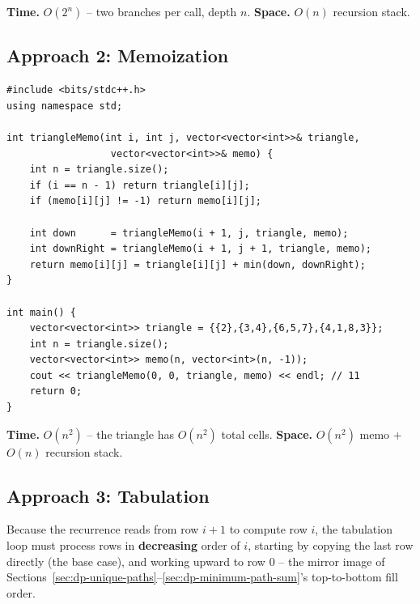\begin{complexitybox}
\textbf{Time.} $O(2^n)$ -- two branches per call, depth $n$.
\textbf{Space.} $O(n)$ recursion stack.
\end{complexitybox}

\subsection*{Approach 2: Memoization}

\begin{lstlisting}
#include <bits/stdc++.h>
using namespace std;

int triangleMemo(int i, int j, vector<vector<int>>& triangle,
                  vector<vector<int>>& memo) {
    int n = triangle.size();
    if (i == n - 1) return triangle[i][j];
    if (memo[i][j] != -1) return memo[i][j];

    int down      = triangleMemo(i + 1, j, triangle, memo);
    int downRight = triangleMemo(i + 1, j + 1, triangle, memo);
    return memo[i][j] = triangle[i][j] + min(down, downRight);
}

int main() {
    vector<vector<int>> triangle = {{2},{3,4},{6,5,7},{4,1,8,3}};
    int n = triangle.size();
    vector<vector<int>> memo(n, vector<int>(n, -1));
    cout << triangleMemo(0, 0, triangle, memo) << endl; // 11
    return 0;
}
\end{lstlisting}

\begin{complexitybox}
\textbf{Time.} $O(n^2)$ -- the triangle has $O(n^2)$ total cells.
\textbf{Space.} $O(n^2)$ memo $+$ $O(n)$ recursion stack.
\end{complexitybox}

\subsection*{Approach 3: Tabulation}

\begin{ideabox}
Because the recurrence reads from row $i+1$ to compute row $i$, the
tabulation loop must process rows in \textbf{decreasing} order of $i$,
starting by copying the last row directly (the base case), and working
upward to row $0$ -- the mirror image of Sections~\ref{sec:dp-unique-paths}--\ref{sec:dp-minimum-path-sum}'s
top-to-bottom fill order.
\end{ideabox}

